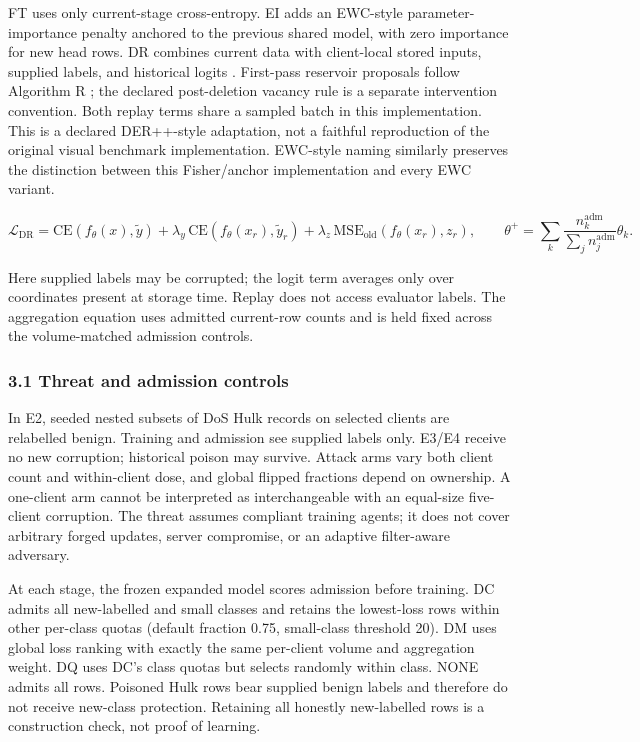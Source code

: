 \documentclass[
  10pt,
  a4paper,
]{article}
\begin{document}
FT uses only current-stage cross-entropy. EI adds an EWC-style \cite{ewc}
parameter-importance penalty anchored to the previous shared model, with
zero importance for new head rows. DR combines current data with
client-local stored inputs, supplied labels, and historical logits
\cite{der}. First-pass reservoir proposals follow Algorithm R \cite{vitter}; the
declared post-deletion vacancy rule is a separate intervention
convention. Both replay terms share a sampled batch in this
implementation. This is a declared DER++-style adaptation, not a
faithful reproduction of the original visual benchmark implementation.
EWC-style naming similarly preserves the distinction between this
Fisher/anchor implementation and every EWC variant.

\[\mathcal{L}_{\mathrm{DR}}=\mathrm{CE}(f_\theta(x),\widetilde y)+\lambda_y\,\mathrm{CE}(f_\theta(x_r),\widetilde y_r)+\lambda_z\,\mathrm{MSE}_{\mathrm{old}}(f_\theta(x_r),z_r),\qquad \theta^{+}=\sum_k\frac{n_k^{\mathrm{adm}}}{\sum_j n_j^{\mathrm{adm}}}\theta_k.\]

Here supplied labels may be corrupted; the logit term averages only over
coordinates present at storage time. Replay does not access evaluator
labels. The aggregation equation uses admitted current-row counts and is
held fixed across the volume-matched admission controls.

\hypertarget{threat-and-admission-controls}{%
\subsubsection{3.1 Threat and admission
controls}\label{threat-and-admission-controls}}

In E2, seeded nested subsets of DoS Hulk records on selected clients are
relabelled benign. Training and admission see supplied labels only.
E3/E4 receive no new corruption; historical poison may survive. Attack
arms vary both client count and within-client dose, and global flipped
fractions depend on ownership. A one-client arm cannot be interpreted as
interchangeable with an equal-size five-client corruption. The threat
assumes compliant training agents; it does not cover arbitrary forged
updates, server compromise, or an adaptive filter-aware adversary.

At each stage, the frozen expanded model scores admission before
training. DC admits all new-labelled and small classes and retains the
lowest-loss rows within other per-class quotas (default fraction 0.75,
small-class threshold 20). DM uses global loss ranking with exactly the
same per-client volume and aggregation weight. DQ uses DC's class quotas
but selects randomly within class. NONE admits all rows. Poisoned Hulk
rows bear supplied benign labels and therefore do not receive new-class
protection. Retaining all honestly new-labelled rows is a construction
check, not proof of learning.
\end{document}
